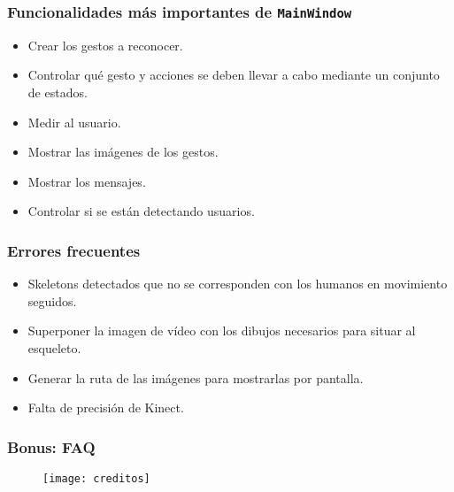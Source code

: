 \documentclass[leqno]{beamer}
\begin{document}
\begin{frame}
\frametitle{Funcionalidades más importantes de \texttt{MainWindow}}

\begin{itemize}
\item Crear los gestos a reconocer.
\item Controlar qué gesto y acciones se deben llevar a cabo mediante un conjunto de estados.
\item Medir al usuario.
\item Mostrar las imágenes de los gestos.
\item Mostrar los mensajes.
\item Controlar si se están detectando usuarios.
\end{itemize}
\end{frame}

\begin{frame}
\frametitle{Errores frecuentes}

\begin{itemize}
\item Skeletons detectados que no se corresponden con los humanos en movimiento seguidos.
\item Superponer la imagen de vídeo con los dibujos necesarios para situar al esqueleto.
\item Generar la ruta de las imágenes para mostrarlas por pantalla.
\item Falta de precisión de Kinect.
\end{itemize}
\end{frame}


\begin{frame}
\frametitle{Bonus: FAQ}
\begin{figure}[htb]
\centering
\texttt{[image: creditos]}
\end{figure}
\end{frame}
\end{document}
